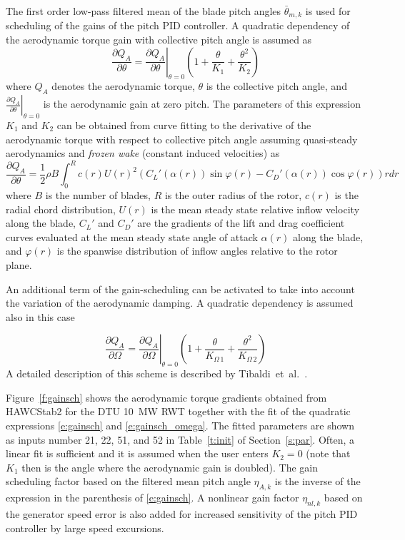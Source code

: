 The first order low-pass filtered mean of the blade pitch angles $\bar \theta_{m,k}$ is used for scheduling of the gains of the pitch PID controller. A quadratic dependency of the aerodynamic torque gain with collective pitch angle is assumed as
\begin{equation}\label{e:gainsch}
\frac{\partial Q_A}{\partial \theta}= \left. \frac{\partial Q_A}{\partial \theta}\right|_{\theta=0}\left(1 + \frac{\theta}{K_{1}} + \frac{\theta^2}{K_{2}}\right)
\end{equation}
where $Q_A$ denotes the aerodynamic torque, $\theta$ is the collective pitch angle, and $\left. \frac{\partial Q_A}{\partial \theta}\right|_{\theta=0}$ is the aerodynamic gain at zero pitch. The parameters of this expression $K_1$ and $K_2$ can be obtained from curve fitting to the derivative of the aerodynamic torque with respect to collective pitch angle assuming quasi-steady aerodynamics and \emph{frozen wake} (constant induced velocities) as
\begin{equation}\label{e:dqadt}
\frac{\partial Q_A}{\partial \theta} = \frac12 \rho B \int_0^R c(r) U(r)^2 \left(
  C_L'(\alpha(r)) \sin \varphi(r)
- C_D'(\alpha(r)) \cos \varphi(r) \right) r dr
\end{equation}
where $B$ is the number of blades, $R$ is the outer radius of the rotor, $c(r)$ is the radial chord distribution, $U(r)$ is the mean steady state relative inflow velocity along the blade, $C_L'$ and $C_D'$ are the gradients of the lift and drag coefficient curves evaluated at the mean steady state angle of attack $\alpha(r)$ along the blade, and $\varphi(r)$ is the spanwise distribution of inflow angles relative to the rotor plane.

An additional term of the gain-scheduling can be activated to take into account the variation of the aerodynamic damping. A quadratic dependency is assumed also in this case

\begin{equation}\label{e:gainsch_omega}
\frac{\partial Q_A}{\partial \Omega}= \left. \frac{\partial Q_A}{\partial \Omega}\right|_{\theta=0}\left(1 + \frac{\theta}{K_{\Omega\,1}} + \frac{\theta^2}{K_{\Omega\,2}}\right)
\end{equation}
A detailed description of this scheme is described by Tibaldi~et~al.~\cite{tibaldi_effects_2014}.

Figure~\ref{f:gainsch} shows the aerodynamic torque gradients obtained from HAWCStab2 for the DTU 10~MW RWT together with the fit of the quadratic expressions \eqref{e:gainsch} and \eqref{e:gainsch_omega}. The fitted parameters are shown as inputs number 21, 22, 51, and 52 in Table~\ref{t:init} of Section~\ref{s:par}. Often, a linear fit is sufficient and it is assumed when the user enters $K_2=0$ (note that $K_1$ then is the angle where the aerodynamic gain is doubled). The gain scheduling factor based on the filtered mean pitch angle $\eta_{A,k}$ is the inverse of the expression in the parenthesis of \eqref{e:gainsch}. A nonlinear gain factor $\eta_{nl,k}$ based on the generator speed error is also added for increased sensitivity of the pitch PID controller by large speed excursions.


